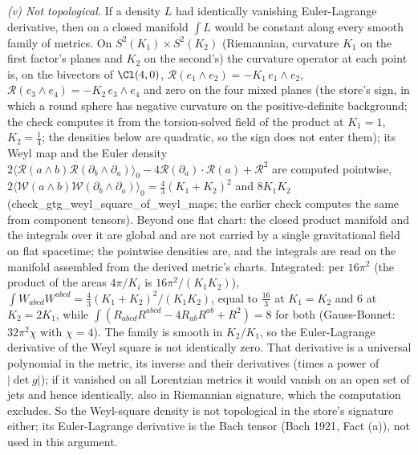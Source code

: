 \emph{(v) Not topological.} If a density $L$ had identically vanishing Euler-Lagrange derivative, then on a closed manifold $\int L$ would be constant along every smooth family of metrics. On $S^{2}(K_{1}) \times S^{2}(K_{2})$ (Riemannian, curvature $K_{1}$ on the first factor's planes and $K_{2}$ on the second's) the curvature operator at each point is, on the bivectors of $\Cl(4,0)$, $\mathcal{R}(e_{1}\wedge e_{2}) = -K_{1}\,e_{1}\wedge e_{2}$, $\mathcal{R}(e_{3}\wedge e_{4}) = -K_{2}\,e_{3}\wedge e_{4}$ and zero on the four mixed planes (the store's sign, in which a round sphere has negative curvature on the positive-definite background; the check computes it from the torsion-solved field of the product at $K_{1} = 1$, $K_{2} = \tfrac14$; the densities below are quadratic, so the sign does not enter them); its Weyl map and the Euler density $2\langle\mathcal{R}(a\wedge b)\mathcal{R}(\partial_{b}\wedge\partial_{a})\rangle_{0} - 4\mathcal{R}(\partial_{a})\cdot\mathcal{R}(a) + \mathcal{R}^{2}$ are computed pointwise, $2\langle\mathcal{W}(a\wedge b)\mathcal{W}(\partial_{b}\wedge\partial_{a})\rangle_{0} = \tfrac43(K_{1} + K_{2})^{2}$ and $8K_{1}K_{2}$ (check\_gtg\_weyl\_square\_of\_weyl\_maps; the earlier check computes the same from component tensors). Beyond one flat chart: the closed product manifold and the integrals over it are global and are not carried by a single gravitational field on flat spacetime; the pointwise densities are, and the integrals are read on the manifold assembled from the derived metric's charts. Integrated: per $16\pi^{2}$ (the product of the areas $4\pi/K_{i}$ is $16\pi^{2}/(K_{1}K_{2})$), $\int W_{abcd}W^{abcd} = \tfrac43(K_{1} + K_{2})^{2}/(K_{1}K_{2})$, equal to $\tfrac{16}{3}$ at $K_{1} = K_{2}$ and $6$ at $K_{2} = 2K_{1}$, while $\int(R_{abcd}R^{abcd} - 4R_{ab}R^{ab} + R^{2}) = 8$ for both (Gauss-Bonnet: $32\pi^{2}\chi$ with $\chi = 4$). The family is smooth in $K_{2}/K_{1}$, so the Euler-Lagrange derivative of the Weyl square is not identically zero. That derivative is a universal polynomial in the metric, its inverse and their derivatives (times a power of $|\det g|$); if it vanished on all Lorentzian metrics it would vanish on an open set of jets and hence identically, also in Riemannian signature, which the computation excludes. So the Weyl-square density is not topological in the store's signature either; its Euler-Lagrange derivative is the Bach tensor (Bach 1921, Fact (a)), not used in this argument.


